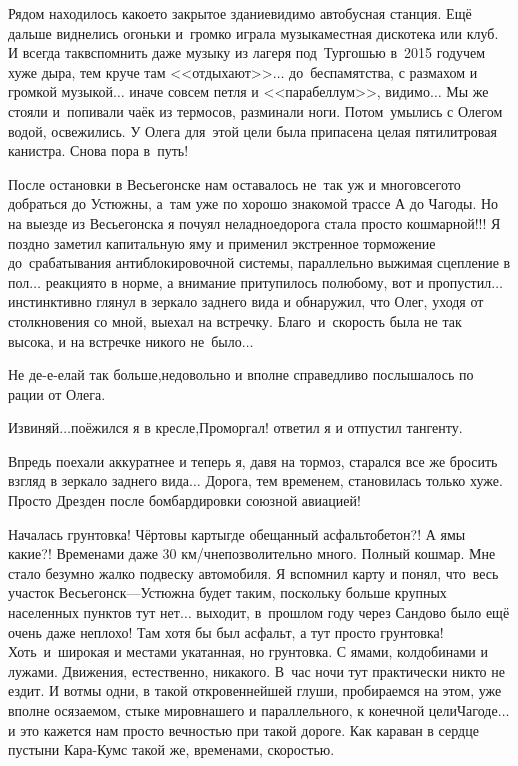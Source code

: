 Рядом находилось какое\sdash то закрытое здание\mdash видимо автобусная станция. Ещё дальше виднелись огоньки и~громко играла музыка\mdash местная дискотека или клуб. И всегда так\mdash вспомнить даже музыку из лагеря под~Тургошью в~2015 году\mdash чем хуже дыра, тем круче там <<отдыхают>>$\ldots$ до~беспамятства, с размахом и громкой музыкой$\ldots$ иначе совсем петля и <<парабеллум>>, видимо$\ldots$ Мы же стояли и~попивали чаёк из термосов, разминали ноги. Потом~умылись с Олегом водой, освежились. У Олега для~этой цели была припасена целая пятилитровая канистра. Снова пора в~путь!

После остановки в Весьегонске нам оставалось не~так уж и много\mdash всего\sdash то добраться до Устюжны, а~там уже по хорошо знакомой трассе А до Чагоды. Но на выезде из Весьегонска я почуял неладное\mdash дорога стала просто кошмарной!!! Я поздно заметил капитальную яму и применил экстренное торможение до~срабатывания антиблокировочной системы, параллельно выжимая сцепление в пол$\ldots$ реакция\sdash то в норме, а внимание притупилось по\sdash любому, вот и пропустил$\ldots$ инстинктивно глянул в зеркало заднего вида и обнаружил, что Олег, уходя от столкновения со мной, выехал на встречку. Благо~и~скорость была не так высока, и на встречке никого не~было$\ldots$ 

\diagdash Не де-е-елай так больше,\mdash недовольно и вполне справедливо послышалось по рации от Олега. 

\diagdash Извиняй$\ldots$\mdash поёжился я в кресле,\mdash Проморгал! \mdash ответил я и отпустил тангенту.

Впредь поехали аккуратнее и теперь я, давя на тормоз, старался все же бросить взгляд в зеркало заднего вида$\ldots$ Дорога, тем временем, становилась только хуже. Просто Дрезден после бомбардировки союзной авиацией! 

Началась грунтовка! Чёртовы карты\mdash где обещанный асфальтобетон?! А ямы какие?! Временами даже 30 км/ч\mdash непозволительно много. Полный кошмар. Мне стало безумно жалко подвеску автомобиля. Я вспомнил карту и понял, что~весь участок Весьегонск\thinspace\nobreakdash---\thinspace Устюжна будет таким, поскольку больше крупных населенных пунктов тут нет$\ldots$ выходит, в~прошлом году через Сандово было ещё очень даже неплохо! Там хотя бы был асфальт, а тут просто грунтовка! Хоть~и~широкая и местами укатанная, но грунтовка. С ямами, колдобинами и лужами. Движения, естественно, никакого. В~час ночи тут практически никто не ездит. И вот\mdash мы одни, в такой откровеннейшей глуши, пробираемся на этом, уже вполне осязаемом, стыке миров\mdash нашего и параллельного, к конечной цели\mdash Чагоде$\ldots$ и это кажется нам просто вечностью при такой дороге. Как караван в сердце пустыни Кара-Кум\mdash с такой же, временами, скоростью.


